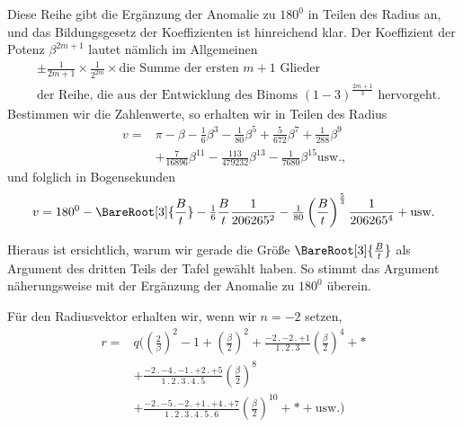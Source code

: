 \par
Diese Reihe gibt die Ergänzung der Anomalie zu \(180^0\) in Teilen des Radius an, und das Bildungsgesetz der Koeffizienten ist hinreichend klar. Der Koeffizient der Potenz \(\beta^{2m+1}\) lautet nämlich im Allgemeinen
\[
\begin{aligned}
&\pm\frac{1}{2m+1}\times\frac{1}{2^{2m}}\times\text{die Summe der ersten }m+1\text{ Glieder}\\
&\text{der Reihe, die aus der Entwicklung des Binoms }(1-3)^{\frac{2m+1}{3}}\text{ hervorgeht.}
\end{aligned}
\]
Bestimmen wir die Zahlenwerte, so erhalten wir in Teilen des Radius
\[
\begin{aligned}
v={}&\pi-\beta-\tfrac16\beta^3-\tfrac1{80}\beta^5+\tfrac5{672}\beta^7+\tfrac1{288}\beta^9\\
&+\tfrac7{16896}\beta^{11}-\tfrac{113}{479232}\beta^{13}-\tfrac1{7680}\beta^{15}\text{usw.,}
\end{aligned}
\]
und folglich in Bogensekunden
\[
v=180^0-\BareRoot[3]{\frac{B}{t}}-\tfrac16\frac{B}{t}\frac1{206265^2}
-\tfrac1{80}\left(\frac{B}{t}\right)^{\frac53}\frac1{206265^4}+\text{usw.}
\]
\par
Hieraus ist ersichtlich, warum wir gerade die Größe \(\BareRoot[3]{\frac{B}{t}}\) als Argument des dritten Teils der Tafel gewählt haben. So stimmt das Argument näherungsweise mit der Ergänzung der Anomalie zu \(180^0\) überein.
\par
Für den Radiusvektor erhalten wir, wenn wir \(n=-2\) setzen,
\[
\begin{aligned}
r={}&q\Biggl(\left(\frac2\beta\right)^2-1+\left(\frac\beta2\right)^2
+\frac{-2\mathpunct{.}-2\mathpunct{.}+1}{1\mathpunct{.}2\mathpunct{.}3}\left(\frac\beta2\right)^4+\ast\\
&+\frac{-2\mathpunct{.}-4\mathpunct{.}-1\mathpunct{.}+2\mathpunct{.}+5}{1\mathpunct{.}2\mathpunct{.}3\mathpunct{.}4\mathpunct{.}5}\left(\frac\beta2\right)^8\\
&+\frac{-2\mathpunct{.}-5\mathpunct{.}-2\mathpunct{.}+1\mathpunct{.}+4\mathpunct{.}+7}{1\mathpunct{.}2\mathpunct{.}3\mathpunct{.}4\mathpunct{.}5\mathpunct{.}6}\left(\frac\beta2\right)^{10}+\ast+\text{usw.}\Biggr)
\end{aligned}
\]
